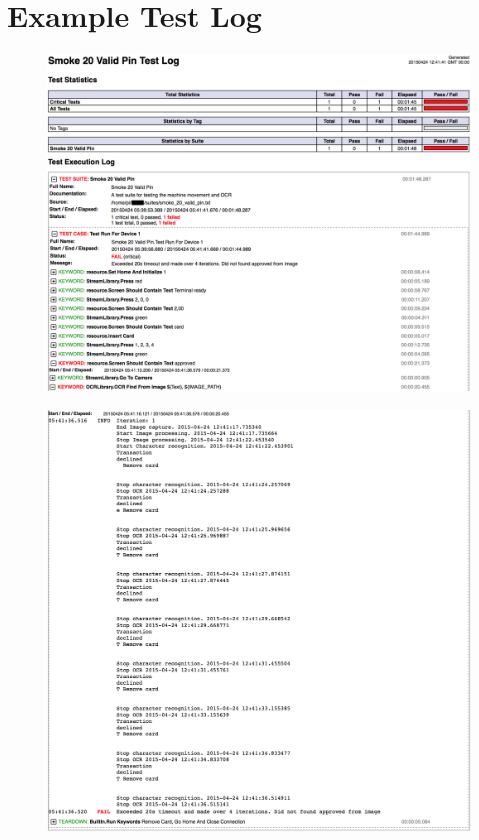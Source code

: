 
\chapter{Example Test Log}
\label{chapter:first-appendix}

\begin{figure}[htbp]
\begin{center}
\includegraphics[width=1\textwidth]{images/first_log.png}
\label{fig:passed}
\end{center}
\end{figure}

\begin{figure}[htbp]
\begin{center}
\includegraphics[width=1\textwidth]{images/second_log.png}
\label{fig:passed_2}
\end{center}
\end{figure}

%